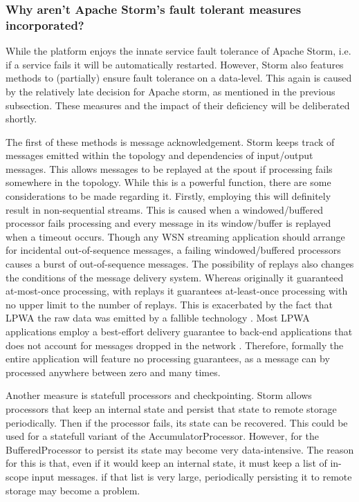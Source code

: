 \subsubsection{Why aren't Apache Storm's fault tolerant measures incorporated?}
While the platform enjoys the innate service fault tolerance of Apache Storm, i.e. if a service fails it will be automatically restarted. However, Storm also features methods to (partially) ensure fault tolerance on a data-level. This again is caused by the relatively late decision for Apache storm, as mentioned in the previous subsection. These measures and the impact of their deficiency will be deliberated shortly.

The first of these methods is message acknowledgement. Storm keeps track of messages emitted within the topology and dependencies of input/output messages. This allows messages to be replayed at the spout if processing fails somewhere in the topology. While this is a powerful function, there are some considerations to be made regarding it. Firstly, employing this will definitely result in non-sequential streams. This is caused when a windowed/buffered processor fails processing and every message in its window/buffer is replayed when a timeout occurs. Though any WSN streaming application should arrange for incidental out-of-sequence messages, a failing windowed/buffered processors causes a burst of out-of-sequence messages. The possibility of replays also changes the conditions of the message delivery system. Whereas originally it guaranteed at-most-once processing, with replays it guarantees at-least-once processing with no upper limit to the number of replays. This is exacerbated by the fact that LPWA the raw data was emitted by a fallible technology \cite{ontology}. Most LPWA applications employ a best-effort delivery guarantee to back-end applications that does not account for messages dropped in the network \cite{stream_requirements}. Therefore, formally the entire application will feature no processing guarantees, as a message can by processed anywhere between zero and many times.

Another measure is statefull processors and checkpointing. Storm allows processors that keep an internal state and persist that state to remote storage periodically. Then if the processor fails, its state can be recovered. This could be used for a statefull variant of the AccumulatorProcessor. However, for the BufferedProcessor to persist its state may become very data-intensive. The reason for this is that, even if it would keep an internal state, it must keep a list of in-scope input messages. if that list is very large, periodically persisting it to remote storage may become a problem.

